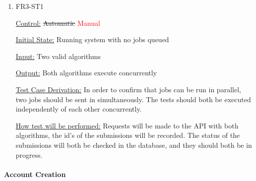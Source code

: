 \documentclass[12pt, titlepage]{article}
\begin{document}
\begin{enumerate}
					
\item{FR3-ST1\\}

\underline{Control:} \sout{Automatic}  \textcolor{red} {Manual}

\underline{Initial State:} Running system with no jobs queued

\underline{Input:} Two valid algorithms

\underline{Output:} Both algorithms execute concurrently

\underline{Test Case Derivation:} In order to confirm that jobs can be run in parallel, two jobs should be sent in simultaneously. The tests should both be executed independently of each other concurrently. 

\underline{How test will be performed:} Requests will be made to the API with both algorithms, the id’s of the submissions will be recorded. The status of the submissions will both be checked in the database, and they should both be in progress.

\end{enumerate}

\paragraph{Account Creation}
\end{document}
